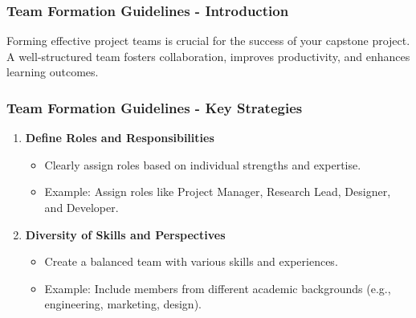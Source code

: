 \documentclass[aspectratio=169]{beamer}
\begin{document}
\begin{frame}[fragile]
    \frametitle{Team Formation Guidelines - Introduction}
    Forming effective project teams is crucial for the success of your capstone project. 
    A well-structured team fosters collaboration, improves productivity, and enhances learning outcomes.
\end{frame}

\begin{frame}[fragile]
    \frametitle{Team Formation Guidelines - Key Strategies}
    \begin{enumerate}
        \item \textbf{Define Roles and Responsibilities}
            \begin{itemize}
                \item Clearly assign roles based on individual strengths and expertise.
                \item Example: Assign roles like Project Manager, Research Lead, Designer, and Developer.
            \end{itemize}
        
        \item \textbf{Diversity of Skills and Perspectives}
            \begin{itemize}
                \item Create a balanced team with various skills and experiences.
                \item Example: Include members from different academic backgrounds (e.g., engineering, marketing, design).
            \end{itemize}
    \end{enumerate}
\end{frame}
\end{document}
